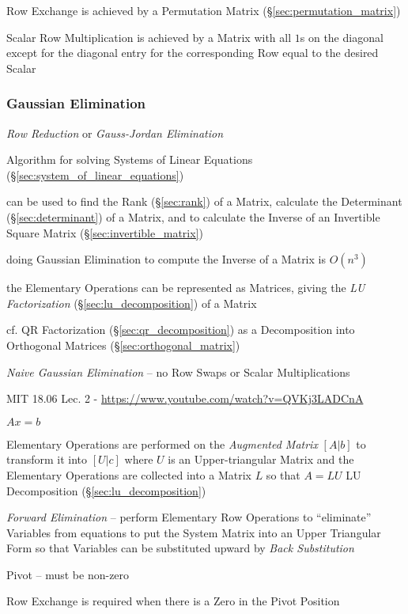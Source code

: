 Row Exchange is achieved by a Permutation Matrix
(\S\ref{sec:permutation_matrix})

Scalar Row Multiplication is achieved by a Matrix with all $1$s on the diagonal
except for the diagonal entry for the corresponding Row equal to the desired
Scalar



\subsubsection{Gaussian Elimination}\label{sec:gaussian_elimination}

\emph{Row Reduction} or \emph{Gauss-Jordan Elimination}

Algorithm for solving Systems of Linear Equations
(\S\ref{sec:system_of_linear_equations})

can be used to find the Rank (\S\ref{sec:rank}) of a Matrix, calculate the
Determinant (\S\ref{sec:determinant}) of a Matrix, and to calculate the Inverse
of an Invertible Square Matrix (\S\ref{sec:invertible_matrix})

doing Gaussian Elimination to compute the Inverse of a Matrix is $O(n^3)$

the Elementary Operations can be represented as Matrices, giving the \emph{LU
  Factorization} (\S\ref{sec:lu_decomposition}) of a Matrix

cf. QR Factorization (\S\ref{sec:qr_decomposition}) as a Decomposition into
Orthogonal Matrices (\S\ref{sec:orthogonal_matrix})

\emph{Naive Gaussian Elimination} -- no Row Swaps or Scalar Multiplications

\asterism

MIT 18.06 Lec. 2 - \url{https://www.youtube.com/watch?v=QVKj3LADCnA}

$Ax = b$

Elementary Operations are performed on the \emph{Augmented Matrix} $[A | b]$ to
transform it into $[U | c]$ where $U$ is an Upper-triangular Matrix and the
Elementary Operations are collected into a Matrix $L$ so that $A = LU$ \fist LU
Decomposition (\S\ref{sec:lu_decomposition})

\emph{Forward Elimination} -- perform Elementary Row Operations to
``eliminate'' Variables from equations to put the System Matrix into an Upper
Triangular Form so that Variables can be substituted upward by \emph{Back
  Substitution}

Pivot -- must be non-zero

Row Exchange is required when there is a Zero in the Pivot Position

